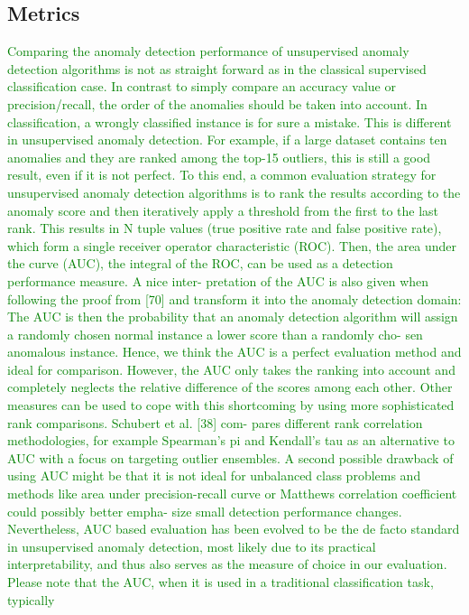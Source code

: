 \subsection{Metrics}
\textcolor{green}
{Comparing the anomaly detection performance of unsupervised anomaly detection algorithms
is not as straight forward as in the classical supervised classification case. In contrast to simply
compare an accuracy value or precision/recall, the order of the anomalies should be taken into
account. In classification, a wrongly classified instance is for sure a mistake. This is different in
unsupervised anomaly detection. For example, if a large dataset contains ten anomalies and
they are ranked among the top-15 outliers, this is still a good result, even if it is not perfect. To
this end, a common evaluation strategy for unsupervised anomaly detection algorithms is to
rank the results according to the anomaly score and then iteratively apply a threshold from the
first to the last rank. This results in N tuple values (true positive rate and false positive rate),
which form a single receiver operator characteristic (ROC). Then, the area under the curve
(AUC), the integral of the ROC, can be used as a detection performance measure. A nice inter-
pretation of the AUC is also given when following the proof from [70] and transform it into
the anomaly detection domain: The AUC is then the probability that an anomaly detection
algorithm will assign a randomly chosen normal instance a lower score than a randomly cho-
sen anomalous instance. Hence, we think the AUC is a perfect evaluation method and ideal for
comparison. However, the AUC only takes the ranking into account and completely neglects
the relative difference of the scores among each other. Other measures can be used to cope
with this shortcoming by using more sophisticated rank comparisons. Schubert et al. [38] com-
pares different rank correlation methodologies, for example Spearman’s pi and Kendall’s tau as an
alternative to AUC with a focus on targeting outlier ensembles. A second possible drawback of
using AUC might be that it is not ideal for unbalanced class problems and methods like area
under precision-recall curve or Matthews correlation coefficient could possibly better empha-
size small detection performance changes. Nevertheless, AUC based evaluation has been
evolved to be the de facto standard in unsupervised anomaly detection, most likely due to its
practical interpretability, and thus also serves as the measure of choice in our evaluation.
Please note that the AUC, when it is used in a traditional classification task, typically
}
